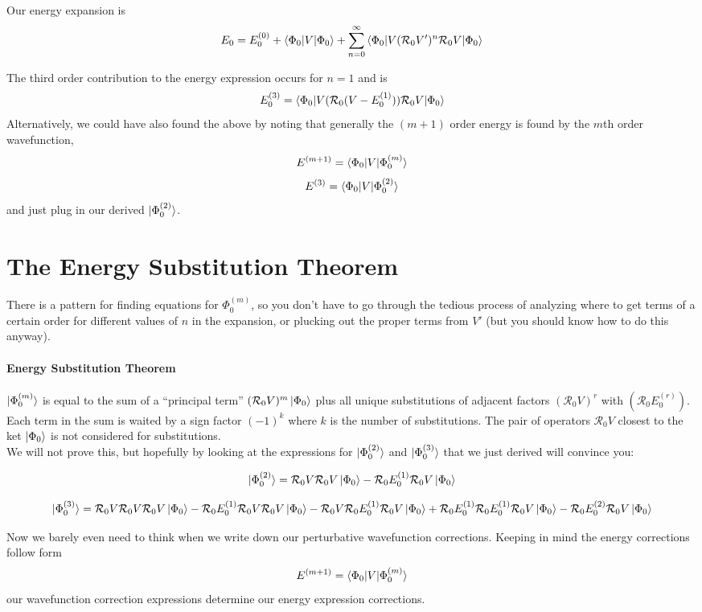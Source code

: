 \documentclass{article}
\newcommand{\Ezero}{E^{(0)}}
\newcommand{\Rz}{\mathcal{R}_{0}}
\newcommand{\Eone}{E^{(1)}}
\begin{document}
Our energy expansion is 
\[E_0 = \Ezero_0 + \braket{\Phi_0|V|\Phi_0} + \sum_{n=0}^{\infty} \braket{\Phi_0|V (\Rz V')^n \Rz V | \Phi_0}\]

The third order contribution to the energy expression occurs for $n=1$ and is 
\[ E_0^{(3)} = \braket{\Phi_0 | V ( \Rz (V - E_0^{(1)})) \Rz V | \Phi_0} \]
Alternatively, we could have also found the above by noting that generally the $(m+1)$ order energy is found
by the $m$th order wavefunction,
\[ E^{(m+1)} = \braket{\Phi_0 | V | \Phi_0^{(m)}} \]
\[ E^{(3)} = \braket{\Phi_0 | V | \Phi_0^{(2)}} \]
and just plug in our derived $\ket{\Phi_0^{(2)}}$.

\section{The Energy Substitution Theorem}
There is a pattern for finding equations for $\Phi_0^{(m)}$, so you don't have to
go through the tedious process of analyzing where to get terms of a certain order for different
values of $n$ in the expansion, or plucking out the proper terms from $V'$
(but you should know how to do this anyway).

\paragraph{\textbf{Energy Substitution Theorem}}
 $\ket{\Phi_0^{(m)}}$ is equal to the sum of a ``principal term'' 
 $(\Rz V)^m \ket{\Phi_0} $ plus all unique substitutions of 
adjacent factors $(\Rz V)^r$ with $(\Rz E_0^{(r)})$. Each term
in the sum is waited by a sign factor $(-1)^k$ where $k$ is the number of substitutions.
The pair of operators $\Rz V$ closest to the ket $\ket{\Phi_0}$ is not considered for substitutions. \\

We will not prove this, but hopefully by looking at the expressions for  $\ket{\Phi_0^{(2)}}$ and $\ket{\Phi_0^{(3)}}$ that we just derived will convince you:

\[\ket{\Phi_0^{(2)}} = \Rz V \Rz V \ket{\Phi_0} - \Rz \Eone_0 \Rz V \ket{\Phi_0}\]

\[\ket{\Phi_0^{(3)}} = \Rz V \Rz V \Rz V \ket{\Phi_0} - \Rz \Eone_0 \Rz V \Rz V \ket{\Phi_0} 
  - \Rz V \Rz \Eone_0 \Rz V \ket{\Phi_0} + \Rz E_0^{(1)} \Rz E_0^{(1)} \Rz V \ket{\Phi_0} 
 - \Rz E_0^{(2)} \Rz V \ket{\Phi_0} \]


Now we barely even need to think when we write down our perturbative wavefunction corrections.
Keeping in mind the energy corrections follow form
\[ E^{(m+1)} = \braket{\Phi_0 | V | \Phi_0^{(m)}} \]
our wavefunction correction expressions determine our energy expression corrections.
\end{document}
